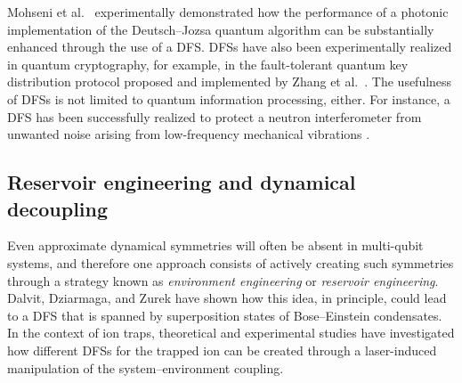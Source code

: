 \documentclass[3p,sort&compress,12pt]{elsarticle}
\begin{document}
Mohseni et al.\ \cite{Mohseni:2003:pp} experimentally demonstrated how the performance of a photonic implementation of the Deutsch--Jozsa quantum algorithm \cite{Deutsch:1989:mm} can be substantially enhanced through the use of a DFS. DFSs have also been experimentally realized in quantum cryptography, for example, in the fault-tolerant quantum key distribution protocol proposed and implemented by Zhang et al.\ \cite{Zhang:2006:zz}. The usefulness of DFSs is not limited to quantum information processing, either. For instance, a DFS has been successfully realized to protect a neutron interferometer from unwanted noise arising from low-frequency mechanical vibrations \cite{Pushin:2011:zz}. 
 
\subsection{\label{sec:reserv-engin-quant}Reservoir engineering and dynamical decoupling}

Even approximate dynamical symmetries will often be absent in multi-qubit systems, and therefore one approach consists of actively creating such symmetries through a strategy known as \emph{environment engineering} or \emph{reservoir engineering}. Dalvit, Dziarmaga, and Zurek \cite{Dalvit:2000:bb} have shown how this idea, in principle, could lead to a DFS that is spanned by superposition states of Bose--Einstein condensates. In the context of ion traps, theoretical \cite{Poyatos:1996:um} and experimental \cite{Myatt:2000:yy,Turchette:2000:aa,Carvalho:2001:ua} studies have investigated how different DFSs for the trapped ion can be created through a laser-induced manipulation of the system--environment coupling. 
\end{document}
